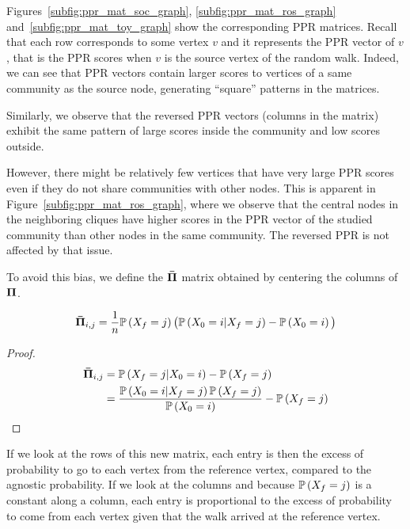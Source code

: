Figures~\ref{subfig:ppr_mat_soc_graph}, \ref{subfig:ppr_mat_ros_graph} and~\ref{subfig:ppr_mat_toy_graph} show the corresponding PPR matrices. Recall that each row corresponds to some vertex $v$ and it represents the PPR vector of $v$, that is the PPR scores when $v$ is the source vertex of the random walk. Indeed, we can see that PPR vectors contain larger scores to vertices of a same community as the source node, generating “square” patterns in the matrices.

Similarly, we observe that the reversed PPR vectors (columns in the matrix) exhibit the same pattern of large scores inside the community and low scores outside.

However, there might be relatively few vertices that have very large PPR scores even if they do not share communities with other nodes. This is apparent in Figure~\ref{subfig:ppr_mat_ros_graph}, where we observe that the central nodes in the neighboring cliques have higher scores in the PPR vector of the studied community than other nodes in the same community. The reversed PPR is not affected by that issue.

To avoid this bias, we define the $\boldsymbol{\Bar{\Pi}}$ matrix obtained by centering the columns of $\boldsymbol{\Pi}$.

\begin{property}
    \begin{equation*}
        \boldsymbol{\Bar{\Pi}}_{i, j} = \frac{1}{n}\mathbb{P}\left(X_f = j\right)\big(\mathbb{P}\left(X_0=i|X_f=j\right)-\mathbb{P}\left(X_0 = i\right)\big)
    \end{equation*}
\end{property}

\begin{proof}
\begin{align*}
        \boldsymbol{\Bar{\Pi}}_{i, j} & =  \mathbb{P}\left(X_f = j | X_0 = i\right) - \mathbb{P}\left(X_f = j\right) \\
         & =  \frac{\mathbb{P}\left(X_0 = i | X_f = j\right)\mathbb{P}\left(X_f = j\right)}{
            \mathbb{P}\left(X_0=i\right)
        }
         - \mathbb{P}\left(X_f = j\right)
\end{align*}
\end{proof}

If we look at the rows of this new matrix, each entry is then the excess of probability to go to each vertex from the reference vertex, compared to the agnostic probability. If we look at the columns and because $\mathbb{P}\left(X_f =j\right)$ is a constant along a column, each entry is proportional to the excess of probability to come from each vertex given that the walk arrived at the reference vertex.

